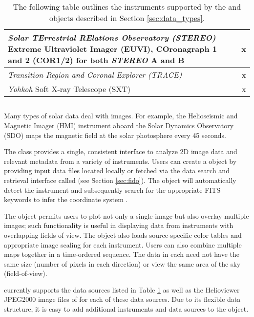 \begin{table}
\begin{center}
\begin{tabular}{|p{10cm}|c|c|}
\hline
\textit{Solar TErrestrial RElations Observatory (STEREO)} Extreme Ultraviolet Imager (EUVI), COronagraph 1 and 2 (COR1/2) for both \textit{STEREO} A and B \citep{howard2008sun} & & x \\
\hline
\textit{Transition Region and Coronal Explorer (TRACE)} \citep{handy99} & & x \\
\hline
\textit{Yohkoh} Soft X-ray Telescope (SXT) \citep{tsuneta1991soft} & & x \\
\hline
\end{tabular}
\end{center}
\caption{The following table outlines the instruments supported by the \Timeseries and \Map objects described in Section \ref{sec:data_types}.}
\label{tab:instruments}
\end{table}

\subsection{\Map}
\label{sec:map}
Many types of solar data deal with images. For example, the Helioseismic and Magnetic Imager (HMI) instrument aboard the Solar Dynamics Observatory (SDO) maps the magnetic field at the solar photosphere every 45 seconds. 

The \Map class provides a single, consistent interface to analyze 2D image data and relevant metadata from a variety of instruments. 
Users can create a \Map object by providing input data files located locally or fetched via the \sunpypkg data search and retrieval interface called \Fido (see Section \ref{sec:fido}). The \Map object will automatically detect the instrument and subsequently search for the appropriate FITS keywords to infer the coordinate system \citep{refId0, 2006A&A...449..791T}.

The \Map object permits users to plot not only a single image but also overlay multiple images; such functionality is useful in displaying data from instruments with overlapping fields of view. The \Map object also loads source-specific color tables and appropriate image scaling for each instrument.
Users can also combine multiple maps together in a time-ordered sequence. The data in each \Map need not have the same size (number of pixels in each direction) or view the same area of the sky (field-of-view). 

\Map currently supports the data sources listed in Table \ref{tab:instruments} as well as the Helioviewer JPEG2000 image files of for each of these data sources. Due to its flexible data structure, it is easy to add additional instruments and data sources to the \Map object.
